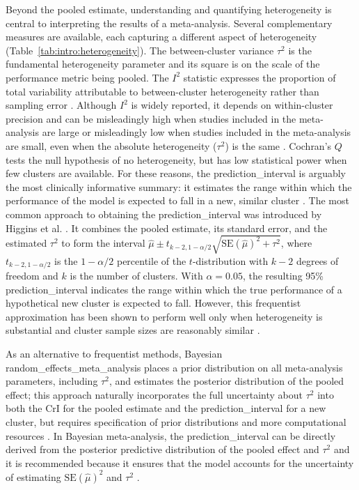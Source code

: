 Beyond the pooled estimate, understanding and quantifying \gls{heterogeneity} is central to interpreting the results of a meta-analysis. Several complementary measures are available, each capturing a different aspect of \gls{heterogeneity} (Table~\ref{tab:intro:heterogeneity}). The between-cluster variance $\tau^2$ is the fundamental \gls{heterogeneity} parameter and its square is on the scale of the performance metric being pooled. The $I^2$ statistic expresses the proportion of total variability attributable to between-cluster \gls{heterogeneity} rather than sampling error \cite{higginsQuantifyingHeterogeneityMetaanalysis2002}. Although $I^2$ is widely reported, it depends on within-cluster precision and can be misleadingly high when studies included in the meta-analysis are large or misleadingly low when studies included in the meta-analysis are small, even when the absolute \gls{heterogeneity} ($\tau^2$) is the same \cite{steyerbergAssessmentHeterogeneityIndividual2019}. Cochran's $Q$ tests the null hypothesis of no \gls{heterogeneity}, but has low statistical power when few clusters are available. For these reasons, the \gls{prediction_interval} is arguably the most clinically informative summary: it estimates the range within which the performance of the model is expected to fall in a new, similar cluster \cite{higginsReevaluationRandomeffectsMetaanalysis2009,partlettRandomEffectsMetaanalysis2017}. The most common approach to obtaining the \gls{prediction_interval} was introduced by Higgins et al. \cite{higginsReevaluationRandomeffectsMetaanalysis2009}. It combines the pooled estimate, its standard error, and the estimated $\tau^2$ to form the interval $\hat{\mu} \pm t_{k-2, 1-\alpha/2} \sqrt{\text{SE}(\hat{\mu})^2 + \tau^2}$, where $t_{k-2, 1-\alpha/2}$ is the $1-\alpha/2$ percentile of the $t$-distribution with $k-2$ degrees of freedom and $k$ is the number of clusters. With $\alpha = 0.05$, the resulting 95\% \gls{prediction_interval} indicates the range within which the true performance of a hypothetical new cluster is expected to fall. However, this frequentist approximation has been shown to perform well only when \gls{heterogeneity} is substantial and cluster sample sizes are reasonably similar \cite{partlettRandomEffectsMetaanalysis2017}. 

As an alternative to frequentist methods, Bayesian \gls{random_effects_meta_analysis} places a prior distribution on all meta-analysis parameters, including $\tau^2$, and estimates the posterior distribution of the pooled effect; this approach naturally incorporates the full uncertainty about $\tau^2$ into both the \gls{CrI} for the pooled estimate and the \gls{prediction_interval} for a new cluster, but requires specification of prior distributions and more computational resources \cite{higginsReevaluationRandomeffectsMetaanalysis2009}. In Bayesian meta-analysis, the \gls{prediction_interval} can be directly derived from the posterior predictive distribution of the pooled effect and $\tau^2$ and it is recommended because it ensures that the model accounts for the uncertainty of estimating $\text{SE}(\hat{\mu})^2$ and $\tau^2$ \cite{debrayFrameworkMetaanalysisPrediction2019} .

